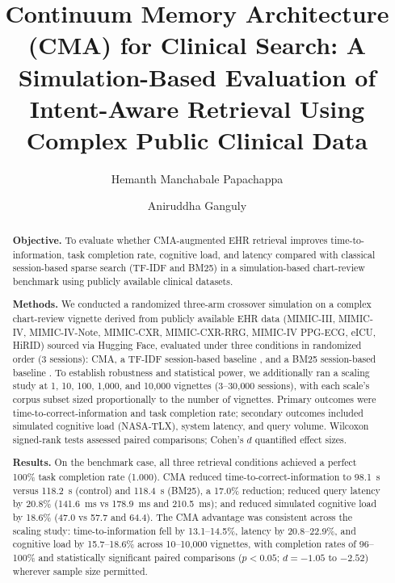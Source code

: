 \documentclass[preprint,12pt]{elsarticle}
\begin{document}
\begin{frontmatter}

\title{Continuum Memory Architecture (CMA) for Clinical Search: A Simulation-Based Evaluation of Intent-Aware Retrieval Using Complex Public Clinical Data}

\author[1]{Hemanth Manchabale Papachappa}
\author[1]{Aniruddha Ganguly}

\begin{abstract}
\textbf{Objective.} To evaluate whether CMA-augmented EHR retrieval improves time-to-information, task completion rate, cognitive load, and latency compared with classical session-based sparse search (TF-IDF and BM25) in a simulation-based chart-review benchmark using publicly available clinical datasets.

\textbf{Methods.} We conducted a randomized three-arm crossover simulation on a complex chart-review vignette derived from publicly available EHR data (MIMIC-III, MIMIC-IV, MIMIC-IV-Note, MIMIC-CXR, MIMIC-CXR-RRG, MIMIC-IV PPG-ECG, eICU, HiRID) sourced via Hugging Face, evaluated under three conditions in randomized order (3 sessions): CMA, a TF-IDF session-based baseline \citep{salton83}, and a BM25 session-based baseline \citep{robertson1995,robertson1976}. To establish robustness and statistical power, we additionally ran a scaling study at 1, 10, 100, 1{,}000, and 10{,}000 vignettes (3--30{,}000 sessions), with each scale's corpus subset sized proportionally to the number of vignettes. Primary outcomes were time-to-correct-information and task completion rate; secondary outcomes included simulated cognitive load (NASA-TLX), system latency, and query volume. Wilcoxon signed-rank tests assessed paired comparisons; Cohen's $d$ quantified effect sizes.

\textbf{Results.} On the benchmark case, all three retrieval conditions achieved a perfect 100\% task completion rate (1.000). CMA reduced time-to-correct-information to 98.1~s versus 118.2~s (control) and 118.4~s (BM25), a 17.0\% reduction; reduced query latency by 20.8\% (141.6~ms vs 178.9~ms and 210.5~ms); and reduced simulated cognitive load by 18.6\% (47.0 vs 57.7 and 64.4). The CMA advantage was consistent across the scaling study: time-to-information fell by 13.1--14.5\%, latency by 20.8--22.9\%, and cognitive load by 15.7--18.6\% across 10--10{,}000 vignettes, with completion rates of 96--100\% and statistically significant paired comparisons ($p < 0.05$; $d = -1.05$ to $-2.52$) wherever sample size permitted.


\end{abstract}
\end{frontmatter}
\end{document}
